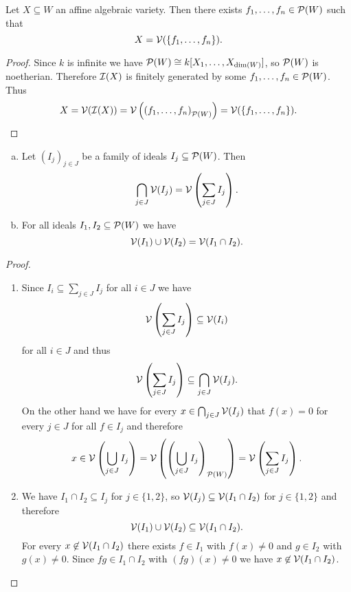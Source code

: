 \begin{cor}
 Let $X \subseteq W$ an affine algebraic variety. Then there exists $f_1, \dotsc, f_n \in \mathcal{P}(W)$ such that
 \[
  X = \mathcal{V}(\{f_1, \dotsc, f_n\}).
 \]
\end{cor}
\begin{proof}
 Since $k$ is infinite we have $\mathcal{P}(W) \cong k[X_1, \dotsc, X_{\dim(W)}]$, so $\mathcal{P}(W)$ is noetherian. Therefore $\mathcal{I}(X)$ is finitely generated by some $f_1, \dotsc, f_n \in \mathcal{P}(W)$. Thus
 \[
  X
  = \mathcal{V}(\mathcal{I}(X))
  = \mathcal{V}\left(\left(f_1, \dotsc, f_n\right)_{\mathcal{P}(W)}\right)
  = \mathcal{V}(\{f_1, \dotsc, f_n\}).
 \]
\end{proof}


\begin{prop}
 \begin{enumerate}[a)]
  \item
  Let $(I_j)_{j \in J}$ be a family of ideals $I_j \subseteq \mathcal{P}(W)$. Then
  \[
   \bigcap_{j \in J} \mathcal{V}(I_j) = \mathcal{V}\left( \sum_{j \in J} I_j \right).
  \]
  \item
  For all ideals $I_1, I_2 \subseteq \mathcal{P}(W)$ we have
  \[
   \mathcal{V}(I_1) \cup \mathcal{V}(I_2) = \mathcal{V}(I_1 \cap I_2).
  \]
 \end{enumerate}
\end{prop}
\begin{proof}
 \begin{enumerate}
  \item
  Since $I_i \subseteq \sum_{j \in J} I_j$ for all $i \in J$ we have
  \[
   \mathcal{V}\left( \sum_{j \in J} I_j \right) \subseteq \mathcal{V}(I_i)
  \]
  for all $i \in J$ and thus
  \[
   \mathcal{V}\left( \sum_{j \in J} I_j \right) \subseteq \bigcap_{j \in J} \mathcal{V}(I_j).
  \]
  On the other hand we have for every $x \in \bigcap_{j \in J} \mathcal{V}(I_j)$ that $f(x) = 0$ for every $j \in J$ for all $f \in I_j$ and therefore
  \[
   x
   \in \mathcal{V}\left( \bigcup_{j \in J} I_j \right)
   = \mathcal{V}\left( \left( \bigcup_{j \in J} I_j \right)_{\mathcal{P}(W)} \right)
   = \mathcal{V}\left( \sum_{j \in J} I_j \right).
  \]
  \item
  We have $I_1 \cap I_2 \subseteq I_j$ for $j \in \{1,2\}$, so $\mathcal{V}(I_j) \subseteq \mathcal{V}(I_1 \cap I_2)$ for $j \in \{1,2\}$ and therefore
  \[
   \mathcal{V}(I_1) \cup \mathcal{V}(I_2) \subseteq \mathcal{V}(I_1 \cap I_2).
  \]
  For every $x \not\in \mathcal{V}(I_1 \cap I_2)$ there exists $f \in I_1$ with $f(x) \neq 0$ and $g \in I_2$ with $g(x) \neq 0$. Since $fg \in I_1 \cap I_2$ with $(fg)(x) \neq 0$ we have $x \not\in \mathcal{V}(I_1 \cap I_2)$.
 \end{enumerate}
\end{proof}


